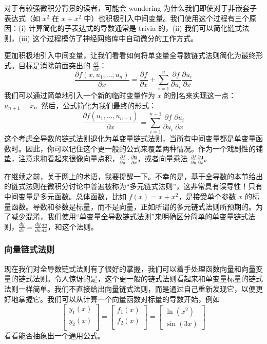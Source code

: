 \documentclass[11pt]{article}
\begin{document}
对于有较强微积分背景的读者，可能会 wondering 为什么我们即使对于非嵌套子表达式（如 $x^2$ 在 $x + x^2$ 中）也积极引入中间变量。我们使用这个过程有三个原因：(i) 计算简化的子表达式的导数通常是 trivia 的，(ii) 我们可以简化链式法则，(iii) 这个过程模仿了神经网络库中自动微分的工作方式。

更加积极地引入中间变量，让我们看看如何将单变量全导数链式法则简化为最终形式。目标是消除前面突出的 $\frac{\partial f}{\partial x}$：
\[
\frac{\partial f(x,u_1,\ldots,u_n)}{\partial x} = \frac{\partial f}{\partial x} + \sum_{i=1}^n \frac{\partial f}{\partial u_i}\frac{\partial  u_i}{\partial  x}
\]
我们可以通过简单地引入一个新的临时变量作为 $x$ 的别名来实现这一点：$u_{n+1} = x$。然后，公式简化为我们最终的形式：
\[
\frac{\partial f(u_1,\ldots,u_{n+1})}{\partial x} = \sum_{i=1}^{n+1} \frac{\partial f}{\partial u_i}\frac{\partial  u_i}{\partial  x}
\]
这个考虑全导数的链式法则退化为单变量链式法则，当所有中间变量都是单变量函数时。因此，你可以记住这个更一般的公式来覆盖两种情况。作为一个戏剧性的铺垫，注意求和看起来很像向量点积，$\frac{\partial f}{\partial \mathbf{u}} \cdot \frac{\partial \mathbf{u}}{\partial x}$，或者向量乘法 $\frac{\partial f}{\partial \mathbf{u}} \frac{\partial \mathbf{u}}{\partial x}$。

在继续之前，关于网上的术语，我要提醒一下。不幸的是，基于全导数的本节给出的链式法则在微积分讨论中普遍被称为“多元链式法则”，这非常具有误导性！只有中间变量是多元函数。总体函数，比如 $f(x) = x + x^2$，是接受单个参数 $x$ 的标量函数。导数和参数是标量，而不是向量，正如所谓的多元链式法则所预期的。为了减少混淆，我们使用“单变量全导数链式法则”来明确区分简单的单变量链式法则，$\frac{dy}{dx} = \frac{dy}{du}\frac{du}{dx}$，和这个法则。


\subsubsection{向量链式法则}\label{sec4.5.3}

现在我们对全导数链式法则有了很好的掌握，我们可以着手处理函数向量和向量变量的链式法则。令人惊讶的是，这个更一般的链式法则看起来和单变量标量的链式法则一样简单。我们不直接给出向量链式法则，而是通过自己重新发现它，以便更好地掌握它。我们可以从计算一个向量函数对标量的导数开始，例如
\[
\begin{bmatrix}
y_1(x)\\
y_2(x)\\
\end{bmatrix} =
\begin{bmatrix}
f_1(x)\\
f_2(x)\\
\end{bmatrix} = 
\begin{bmatrix}
\ln(x^2)\\
\sin(3x)
\end{bmatrix}
\]
看看能否抽象出一个通用公式。
\end{document}
